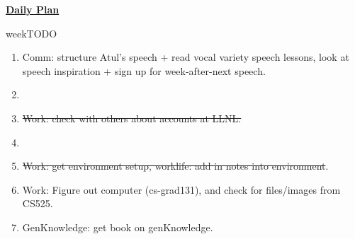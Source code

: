 \documentclass[serif,mathserif,final]{beamer}
\newcommand{\doneTask}[1]{\item \sout{#1}}
\newcommand{\timeEst}[1]{\textit{Time:} \textit{#1}}
\newcommand{\priority}[1]{\textit{Priority:} \textit{#1}}
\newcommand{\comments}[1]{}
\begin{document}
\begin{frame}{}
\begin{columns}[t]
\begin{column}{0.33\linewidth}{\textbf{\underline{Daily Plan}}}
\begin{block}{\small weekTODO}
\begin{enumerate}
\item \tiny Comm: structure Atul's speech + read vocal variety speech lessons, look at speech inspiration + sign up for week-after-next speech. 

\item \tiny \doneTask{Work: check with others about accounts at LLNL. }
\item \tiny \doneTask{Work: get environment setup, worklife: add in notes into environment}. 
\item \tiny Work: Figure out computer (cs-grad131), and check for files/images from CS525. 
\item \tiny GenKnowledge: get book on genKnowledge. 
\end{enumerate}

\end{block} 



\comments{ 
\begin{block}{\small Tuesday} 
\textbf{todo} \\
  \begin{itemize} 



\item \tiny worklife: revise spaces for comp: refine webpresence, put more details on work if possible. 

\item \tiny Mgmt:spaces: fix what's going on in ``work'' in ViveksLaptop directory. 
\item \tiny \doneTask{Work: check with others about accounts at LLNL. }
\item \tiny \doneTask{Work: reply to Amanda's email} 

\item \tiny Work: start adding code to collect data. \priority{IU}
\item \tiny Work: check about the application stuff for Amanda's code. 


  \item \tiny Work: figure whether we need to write  ``how to write a paper'', and could add this to comm guide   \timeEst{1 hour} 


\item \tiny Comm: Finish reading chapter for empathy. 
\item \tiny Comm: Read style guide and put all stuff in. 
\item \tiny Comm: Read How to win friends'' first parts and document / structure. 


\end{itemize}
\end{block}}
\end{column}
\end{columns}
\end{frame}
\end{document}
